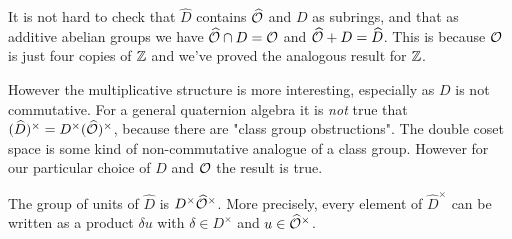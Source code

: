 It is not hard to check that $\widehat{D}$ contains $\widehat{\mathcal{O}}$
and $D$ as subrings, and that as additive abelian groups we have
$\widehat{\mathcal{O}}\cap D=\mathcal{O}$ and $\widehat{\mathcal{O}}+D=\widehat{D}$.
This is because $\mathcal{O}$ is just four copies of $\mathbb{Z}$ and we've proved
the analogous result for $\mathbb{Z}$.

However the multiplicative structure is more interesting, especially
as $D$ is not commutative. For a general quaternion algebra it is \emph{not}
true that $(\widehat{D})^\times=D^\times(\widehat{\mathcal{O}})^\times$, because
there are "class group obstructions". The double coset space is some
kind of non-commutative analogue of a class group. However for our
particular choice of $D$ and $\mathcal{O}$ the result is true.

\begin{theorem}
    \label{Hurwitz.completed_units}
    \leanok
    The group of units of $\widehat{D}$ is $D^\times\widehat{\mathcal{O}}^\times$.
    More precisely, every element of $\widehat{D}^\times$ can be written as a product $\delta u$
    with $\delta\in D^\times$ and $u\in\widehat{\mathcal{O}}^\times$.
\end{theorem}
